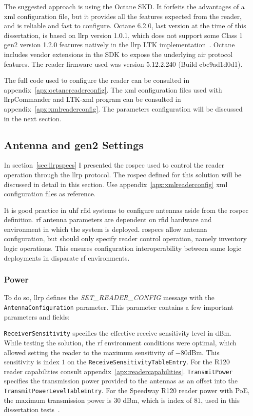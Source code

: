 The suggested approach is using the Octane SKD. It forfeits the advantages of a \ac{xml} configuration file, but it provides all the features expected from the reader, and is reliable and fast to configure.
Octane 6.2.0, last version at the time of this dissertation, is based on \ac{llrp} version 1.0.1, which does not support some Class 1 \ac{gen2} version 1.2.0 features natively in the \ac{llrp} LTK implementation~\cite{ImpinjOctaneLLRP}. Octane includes vendor extensions in the SDK to expose the underlying air protocol features.
The reader firmware used was version 5.12.2.240 (Build cbc9ad1d0d1).

The full code used to configure the reader can be consulted in appendix~\ref{apx:octanereaderconfig}.
The \ac{xml} configuration files used with \ac{llrp}Commander and LTK-\acs{xml} program can be consulted in appendix~\ref{apx:xmlreaderconfig}.
The parameters configuration will be discussed in the next section.

\subsection{Antenna and \acs{gen2} Settings}

In section~\ref{sec:llrpspecs} I presented the \ac{rospec} used to control the reader operation through the \ac{llrp} protocol. The \ac{rospec} defined for this solution will be discussed in detail in this section.
Use appendix~\ref{apx:xmlreaderconfig} \ac{xml} configuration files as reference.

It is good practice in \ac{uhf} \ac{rfid} systems to configure antennas aside from the \ac{rospec} definition. \ac{rf} antenna parameters are dependent on \ac{rfid} hardware and environment in which the system is deployed. \acp{rospec} allow antenna configuration, but should only specify reader control operation, namely inventory logic operations. This ensures configuration interoperability between same logic deployments in disparate \ac{rf} environments.

\subsubsection{Power}

To do so, \ac{llrp} defines the \textit{SET\_READER\_CONFIG} message with the \texttt{AntennaConfiguration} parameter.
This parameter contains a few important parameters and fields:

\texttt{ReceiverSensitivity} specifies the effective receive sensitivity level in dBm. While testing the solution, the \ac{rf} environment conditions were optimal, which allowed setting the reader to the maximum sensitivity of $-80$dBm. This sensitivity is index $1$ on the \texttt{ReceiveSensitivityTableEntry}. For the R120 reader capabilities consult appendix~\ref{apx:readercapabilities}.
\texttt{TransmitPower} specifies the transmission power provided to the antennas as an offset into the \texttt{TransmitPowerLevelTableEntry}. For the Speedway R120 reader power with PoE, the maximum transmission power is $30$ dBm, which is index of $81$, used in this dissertation tests~\cite{ImpinjOctaneLLRP, SettingReceiveSensitivity}.

